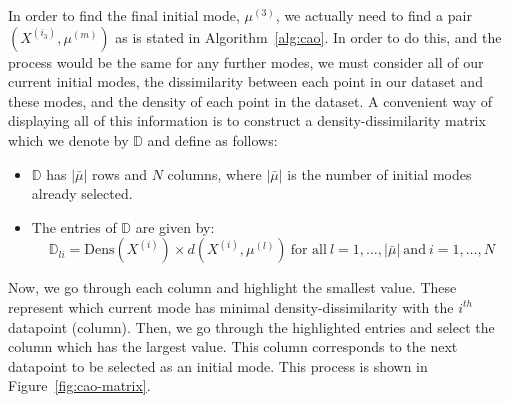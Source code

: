 \begin{example}
    In order to find the final initial mode, \(\mu^{(3)}\), we actually need to
    find a pair \((X^{(i_3)}, \mu^{(m)})\) as is stated in 
    Algorithm~\ref{alg:cao}. In order to do this, and the process would be the
    same for any further modes, we must consider all of our current initial
    modes, the dissimilarity between each point in our dataset and these modes,
    and the density of each point in the dataset. A convenient way of displaying
    all of this information is to construct a density-dissimilarity matrix which
    we denote by \(\mathbb{D}\) and define as follows:
    \begin{itemize}
        \item \(\mathbb{D}\) has \(|\bar{\mu}|\) rows and \(N\) columns, where
            \(|\bar{\mu}|\) is the number of initial modes already selected.
        \item The entries of \(\mathbb{D}\) are given by:
            \[
                \mathbb{D}_{li} = \text{Dens}(X^{(i)}) \times d(X^{(i)},
                \mu^{(l)}) \ \text{for all} \ l = 1, \ldots, |\bar{\mu}| \
                \text{and} \ i = 1, \ldots, N
            \]
    \end{itemize}

    Now, we go through each column and highlight the smallest value. These
    represent which current mode has minimal density-dissimilarity with the
    \(i^{th}\) datapoint (column). Then, we go through the highlighted entries
    and select the column which has the largest value. This column corresponds
    to the next datapoint to be selected as an initial mode. This process is
    shown in Figure~\ref{fig:cao-matrix}.
    
    \begin{figure}[H]
        \centering
\end{figure}
\end{example}
